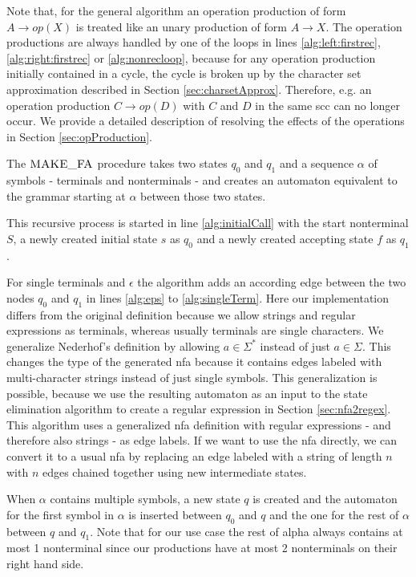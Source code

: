 Note that, for the general algorithm an operation production of form $A \rightarrow op(X)$ is treated like an unary production of form $A \rightarrow X$. The operation productions are always handled by one of the loops in lines \ref{alg:left:firstrec}, \ref{alg:right:firstrec} or \ref{alg:nonrecloop}, because for any operation production initially contained in a cycle, the cycle is broken up by the character set approximation described in Section \ref{sec:charsetApprox}.
Therefore, e.g. an operation production $C \rightarrow op(D)$ with $C$ and $D$ in the same \ac{scc} can no longer occur.
We provide a detailed description of resolving the effects of the operations in Section \ref{sec:opProduction}.

The $\textproc{MAKE\_FA}$ procedure takes two states $q_0$ and $q_1$ and a sequence $\alpha$ of symbols - terminals and nonterminals - and creates an automaton equivalent to the grammar starting at $\alpha$ between those two states.

This recursive process is started in line \ref{alg:initialCall} with the start nonterminal $S$, a newly created initial state $s$ as $q_0$ and a newly created accepting state $f$ as $q_1$.

For single terminals and $\epsilon$ the algorithm adds an according edge between the two nodes $q_0$ and $q_1$ in lines \ref{alg:eps} to \ref{alg:singleTerm}.
Here our implementation differs from the original definition because we allow strings and regular expressions as terminals, whereas usually terminals are single characters. We generalize Nederhof's definition by allowing $a \in \Sigma^*$ instead of just $a \in \Sigma$.
This changes the type of the generated \ac{nfa} because it contains edges labeled with multi-character strings instead of just single symbols. This generalization is possible, because we use the resulting automaton as an input to the state elimination algorithm to create a regular expression in Section \ref{sec:nfa2regex}. This algorithm uses a generalized \ac{nfa} definition with regular expressions - and therefore also strings - as edge labels. If we want to use the \ac{nfa} directly, we can convert it to a usual \ac{nfa} by replacing an edge labeled with a string of length $n$ with $n$ edges chained together using new intermediate states.

When $\alpha$ contains multiple symbols, a new state $q$ is created and the automaton for the first symbol in $\alpha$ is inserted between $q_0$ and $q$ and the one for the rest of $\alpha$ between $q$ and $q_1$. Note that for our use case the rest of alpha always contains at most 1 nonterminal since our productions have at most 2 nonterminals on their right hand side.

